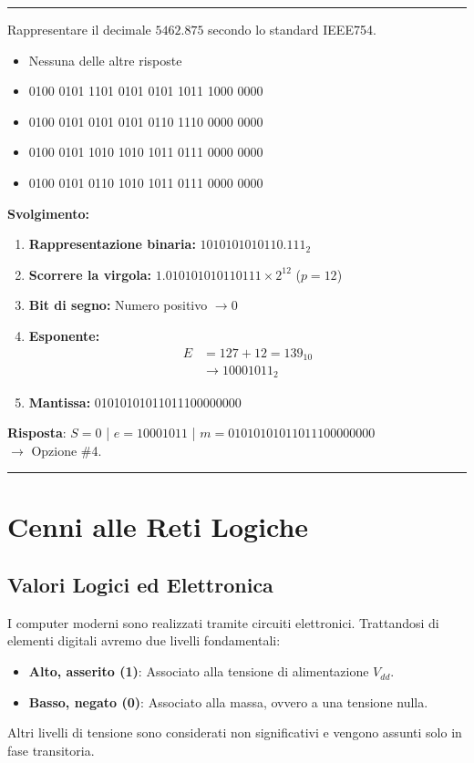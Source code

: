\documentclass[12pt, a4paper]{article}
\begin{document}
\vspace{0.5cm}
\hrule
\vspace{0.5cm}

\newpage
Rappresentare il decimale $5462.875$ secondo lo standard IEEE754.
\begin{itemize}
    \item[$\square$] Nessuna delle altre risposte
    \item[$\square$] 0100 0101 1101 0101 0101 1011 1000 0000
    \item[$\square$] 0100 0101 0101 0101 0110 1110 0000 0000
    \item[$\square$] 0100 0101 1010 1010 1011 0111 0000 0000
    \item[$\blacksquare$] 0100 0101 0110 1010 1011 0111 0000 0000
\end{itemize}

\textbf{Svolgimento:}
\begin{enumerate}
    \item \textbf{Rappresentazione binaria:} $1010101010110.111_2$
    \item \textbf{Scorrere la virgola:}
    $1.010101010110111 \times 2^{12}$ ($p=12$)
    \item \textbf{Bit di segno:} Numero positivo $\rightarrow 0$
    \item \textbf{Esponente:}
    \begin{align*}
    E &= 127 + 12 = 139_{10} \\
      &\rightarrow 10001011_2
    \end{align*}
    \item \textbf{Mantissa:} 01010101011011100000000
\end{enumerate}
\textbf{Risposta}: 
$S=0$ | $e=10001011$ | $m=01010101011011100000000$ \\
$\rightarrow$ Opzione \#4.

\vspace{0.5cm}
\hrule
\vspace{0.5cm}

\section{Cenni alle Reti Logiche}


\subsection{Valori Logici ed Elettronica}
I computer moderni sono realizzati tramite circuiti elettronici. Trattandosi di elementi digitali avremo due livelli fondamentali:
\begin{itemize}
    \item \textbf{Alto, asserito (1)}: Associato alla tensione di alimentazione $V_{dd}$.
    \item \textbf{Basso, negato (0)}: Associato alla massa, ovvero a una tensione nulla.
\end{itemize}
Altri livelli di tensione sono considerati non significativi e vengono assunti solo in fase transitoria.
\end{document}

